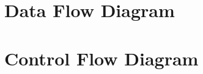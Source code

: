 \documentclass{llncs}
\begin{document}
\section{Data Flow Diagram}
 \newpage

\section{Control Flow Diagram}










\end{document}
